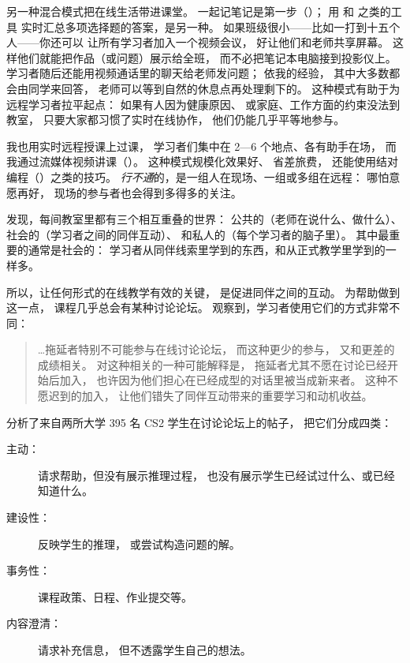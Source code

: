 另一种混合模式把在线生活带进课堂。
一起记笔记是第一步（）；
用 
和  之类的工具
实时汇总多项选择题的答案，是另一种。
如果班级很小——比如一打到十五个人——你还可以
让所有学习者加入一个视频会议，
好让他们和老师共享屏幕。
这样他们就能把作品（或问题）展示给全班，
而不必把笔记本电脑接到投影仪上。
学习者随后还能用视频通话里的聊天给老师发问题；
依我的经验，
其中大多数都会由同学来回答，
老师可以等到自然的休息点再处理剩下的。
这种模式有助于为远程学习者拉平起点：
如果有人因为健康原因、
或家庭、工作方面的约束没法到教室，
只要大家都习惯了实时在线协作，
他们仍能几乎平等地参与。

我也用实时远程授课上过课，
学习者们集中在 2—6 个地点、各有助手在场，
而我通过流媒体视频讲课（）。
这种模式规模化效果好、
省差旅费，
还能使用结对编程（）之类的技巧。
\emph{行不通}的，是一组人在现场、一组或多组在远程：
哪怕意愿再好，
现场的参与者也会得到多得多的关注。


\cite{Nuth2007}发现，每间教室里都有三个相互重叠的世界：
公共的（老师在说什么、做什么）、
社会的（学习者之间的同伴互动）、
和私人的（每个学习者的脑子里）。
其中最重要的通常是社会的：
学习者从同伴线索里学到的东西，和从正式教学里学到的一样多。

所以，让任何形式的在线教学有效的关键，
是促进同伴之间的互动。
为帮助做到这一点，
课程几乎总会有某种讨论论坛。
\cite{Mill2016a}观察到，学习者使用它们的方式非常不同：

\begin{quote}

  {\ldots}拖延者特别不可能参与在线讨论论坛，
  而这种更少的参与，
  又和更差的成绩相关。
  对这种相关的一种可能解释是，
  拖延者尤其不愿在讨论已经开始后加入，
  也许因为他们担心在已经成型的对话里被当成新来者。
  这种不愿迟到的加入，
  让他们错失了同伴互动带来的重要学习和动机收益。

\end{quote}

\cite{Vell2017}分析了来自两所大学 395 名 CS2 学生在讨论论坛上的帖子，
把它们分成四类：

\begin{description}

\item[主动：]
  请求帮助，但没有展示推理过程，
  也没有展示学生已经试过什么、或已经知道什么。

\item[建设性：]
  反映学生的推理，
  或尝试构造问题的解。

\item[事务性：]
  课程政策、日程、作业提交等。

\item[内容澄清：]
  请求补充信息，
  但不透露学生自己的想法。

\end{description}

